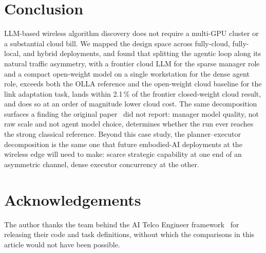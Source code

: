 \documentclass[journal]{IEEEtran}
\newcommand{\todo}[1]{\textcolor{red}{\textbf{[TODO: #1]}}}
\begin{document}
\section{Conclusion}
\label{sec:conclusion}

LLM-based wireless algorithm discovery does not require a multi-GPU cluster or a substantial cloud bill. We mapped the design space across fully-cloud, fully-local, and hybrid deployments, and found that splitting the agentic loop along its natural traffic asymmetry, with a frontier cloud LLM for the sparse manager role and a compact open-weight model on a single workstation for the dense agent role, exceeds both the OLLA reference and the open-weight cloud baseline for the link adaptation task, lands within 2.1\,\% of the frontier closed-weight cloud result, and does so at an order of magnitude lower cloud cost. The same decomposition surfaces a finding the original paper~\cite{aitaoudia2026aite} did not report: manager model quality, not raw scale and not agent model choice, determines whether the run ever reaches the strong classical reference. Beyond this case study, the planner--executor decomposition is the same one that future embodied-AI deployments at the wireless edge will need to make: scarce strategic capability at one end of an asymmetric channel, dense executor concurrency at the other.

\section*{Acknowledgements}
The author thanks the team behind the AI Telco Engineer framework~\cite{aitaoudia2026aite} for releasing their code and task definitions, without which the comparisons in this article would not have been possible.




\end{document}
